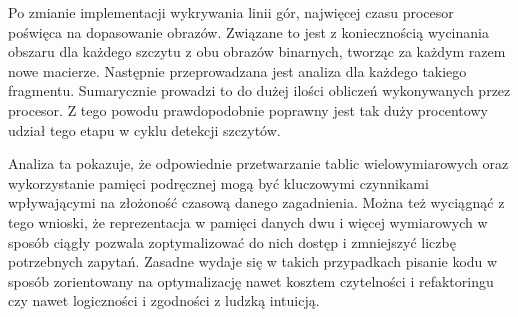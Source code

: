 Po zmianie implementacji wykrywania linii gór, najwięcej czasu procesor poświęca na dopasowanie obrazów. Związane to jest z koniecznością wycinania obszaru dla każdego szczytu z obu obrazów binarnych, tworząc za każdym razem nowe macierze. Następnie przeprowadzana jest analiza dla każdego takiego fragmentu. Sumarycznie prowadzi to do dużej ilości obliczeń wykonywanych przez procesor. Z tego powodu prawdopodobnie poprawny jest tak duży procentowy udział tego etapu w cyklu detekcji szczytów. 

Analiza ta pokazuje, że odpowiednie przetwarzanie tablic wielowymiarowych oraz wykorzystanie pamięci podręcznej mogą być kluczowymi czynnikami wpływającymi na złożoność czasową danego zagadnienia. Można też wyciągnąć z tego wnioski, że reprezentacja w pamięci danych dwu i więcej wymiarowych w sposób ciągły pozwala zoptymalizować do nich dostęp i zmniejszyć liczbę potrzebnych zapytań. Zasadne wydaje się w takich przypadkach pisanie kodu w sposób zorientowany na optymalizację nawet kosztem czytelności i refaktoringu czy nawet logiczności i zgodności z ludzką intuicją.